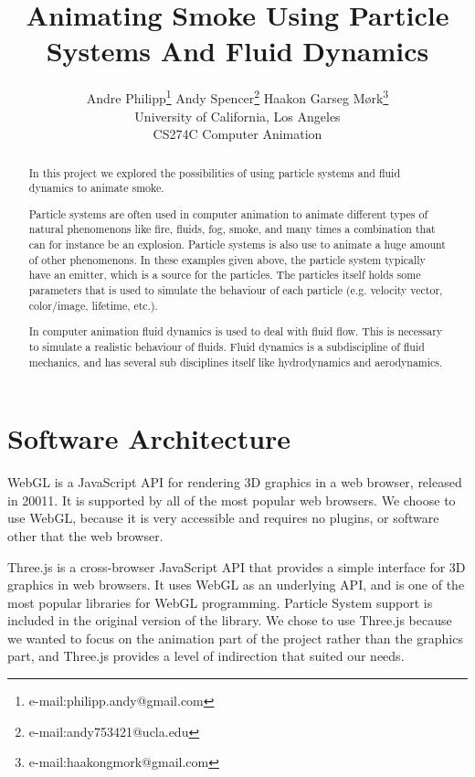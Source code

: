 \documentclass[conference]{acmsiggraph}
\title{Animating Smoke Using Particle Systems And Fluid Dynamics}
\author{
  Andre Philipp\thanks{e-mail:philipp.andy@gmail.com}
  \qquad
  Andy Spencer\thanks{e-mail:andy753421@ucla.edu}
  \qquad
  Haakon Garseg Mørk\thanks{e-mail:haakongmork@gmail.com}
  \\
  University of California, Los Angeles \\
  CS274C Computer Animation
}
\begin{document}

\maketitle

\begin{abstract}

In this project we explored the possibilities of using particle systems and
fluid dynamics to animate smoke.

Particle systems are often used in computer animation to animate different types
of natural phenomenons like fire, fluids, fog, smoke, and many times a
combination that can for instance be an explosion. Particle systems is also use
to animate a huge amount of other phenomenons. In these examples given above,
the particle system typically have an emitter, which is a source for the
particles. The particles itself holds some parameters that is used to simulate
the behaviour of each particle (e.g. velocity vector, color/image, lifetime,
etc.). 

In computer animation fluid dynamics is used to deal with fluid flow. This is
necessary to simulate a realistic behaviour of fluids. Fluid dynamics is a
subdiscipline of fluid mechanics, and has several sub disciplines itself like
hydrodynamics and aerodynamics. 

\end{abstract}

\keywordlist


\section{Software Architecture}

WebGL is a JavaScript API for rendering 3D graphics in a web browser, released
in 20011. It is supported by all of the most popular web browsers. We choose to
use WebGL, because it is very accessible and requires no plugins, or software
other that the web browser.

Three.js is a cross-browser JavaScript API that provides a simple interface for
3D graphics in web browsers. It uses WebGL as an underlying API, and is one of
the most popular libraries for WebGL programming. Particle System support is
included in the original version of the library. We chose to use Three.js
because we wanted to focus on the animation part of the project rather than the
graphics part, and Three.js provides a level of indirection that suited our
needs.
\end{document}
